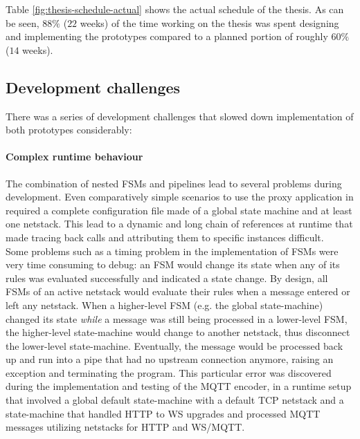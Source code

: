 Table \ref{fig:thesis-schedule-actual} shows the actual schedule of the thesis. As can be seen, $88\%$ ($22$ weeks) of the time working on the thesis was spent designing and implementing the prototypes compared to a planned portion of roughly $60\%$ ($14$ weeks).


\subsection{Development challenges}
\label{sec:pm-challenges}
There was a series of development challenges that slowed down implementation of both prototypes considerably:
\paragraph{Complex runtime behaviour} The combination of nested \acp{FSM} and pipelines lead to several problems during development. Even comparatively simple scenarios to use the proxy application in required a complete configuration file made of a global state machine and at least one netstack. This lead to a dynamic and long chain of references at runtime that made tracing back calls and attributing them to specific instances difficult.\\
Some problems such as a timing problem in the implementation of \acp{FSM} were very time consuming to debug: an \ac{FSM} would change its state when any of its rules was evaluated successfully and indicated a state change. By design, all \acp{FSM} of an active netstack would evaluate their rules when a message entered or left any netstack. When a higher-level \ac{FSM} (e.g. the global state-machine) changed its state \emph{while} a message was still being processed in a lower-level \ac{FSM}, the higher-level state-machine would change to another netstack, thus disconnect the lower-level state-machine. Eventually, the message would be processed back up and run into a pipe that had no upstream connection anymore, raising an exception and terminating the program. This particular error was discovered during the implementation and testing of the \ac{MQTT} encoder, in a runtime setup that involved a global default state-machine with a default \ac{TCP} netstack and a state-machine that handled \ac{HTTP} to \ac{WS} upgrades and processed \ac{MQTT} messages utilizing netstacks for \ac{HTTP} and \ac{WS}/\ac{MQTT}.\\
